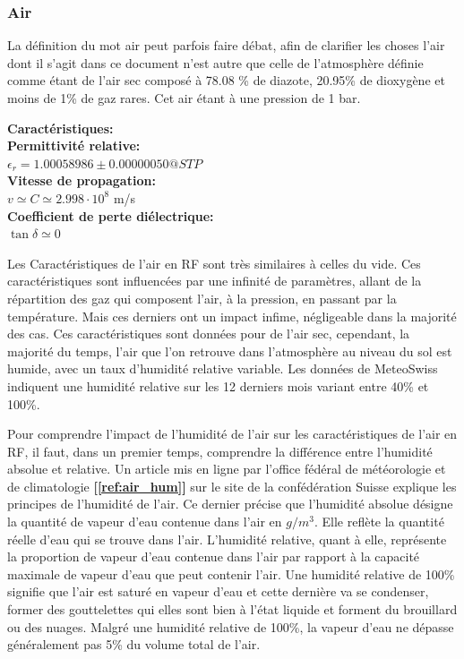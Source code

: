 \documentclass[12pt]{article}
\begin{document}
\newpage
\subsubsection{Air}
La définition du mot air peut parfois faire débat, afin de clarifier les choses l'air dont il s'agit dans ce document n'est autre que celle de l’atmosphère définie comme étant de l'air sec composé à 78.08 \% de diazote, 20.95\% de dioxygène et moins de 1\% de gaz rares. Cet air étant à une pression de 1 bar.

\vspace{1cm}
{\large\textbf{Caractéristiques:}}
\vspace{0.5cm} \\
\textbf{Permittivité relative:} \\
$\epsilon_r = 1.00058986 \pm 0.00000050 @STP$ 
\vspace{0.5cm}\\
\textbf{Vitesse de propagation:} \\
$v \simeq C \simeq 2.998 \cdot 10^8$ m/s
\vspace{0.5cm}\\
\textbf{Coefficient de perte diélectrique:}\\
$\tan\delta \simeq 0$ 
\vspace{1cm}

Les Caractéristiques de l'air en RF sont très similaires à celles du vide. Ces caractéristiques sont influencées par une infinité de paramètres, allant de la répartition des gaz qui composent l'air, à la pression, en passant par la température. Mais ces derniers ont un impact infime, négligeable dans la majorité des cas. Ces caractéristiques sont données pour de l'air sec, cependant, la majorité du temps, l'air que l'on retrouve dans l'atmosphère au niveau du sol est humide, avec un taux d'humidité relative variable. Les données de MeteoSwiss indiquent une humidité relative sur les 12 derniers mois variant entre 40\% et 100\%.  

\vspace{0.5cm}
Pour comprendre l'impact de l'humidité de l'air sur les caractéristiques de l'air en RF, il faut, dans un premier temps, comprendre la différence entre l'humidité absolue et relative. Un article mis en ligne par l'office fédéral de météorologie et de climatologie \textbf{[\ref{ref:air_hum}]} sur le site de la confédération Suisse explique les principes de l'humidité de l'air. Ce dernier précise que l'humidité absolue désigne la quantité de vapeur d'eau contenue dans l'air en $g/m^3$. Elle reflète la quantité réelle d'eau qui se trouve dans l'air. L'humidité relative, quant à elle, représente la proportion de vapeur d'eau contenue dans l'air par rapport à la capacité maximale de vapeur d'eau que peut contenir l'air. Une humidité relative de 100\% signifie que l'air est saturé en vapeur d'eau et cette dernière va se condenser, former des gouttelettes qui elles sont bien à l'état liquide et forment du brouillard ou des nuages. Malgré une humidité relative de 100\%, la vapeur d'eau ne dépasse généralement pas 5\% du volume total de l'air.
\end{document}
